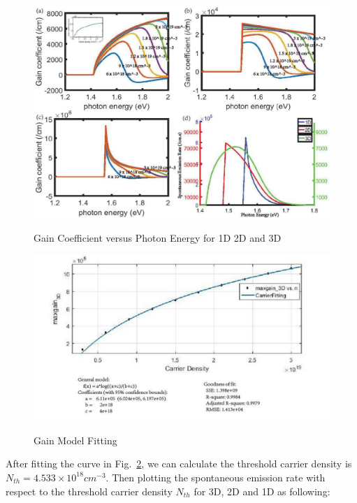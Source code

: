 \begin{figure}
  \caption{Gain Coefficient versus Photon Energy for 1D 2D and 3D}
  \centering
  \includegraphics[width=\textwidth]{pictures/LT/gainspectrum}
  \label{gainspectrum}
\end{figure}

\begin{figure}
  \caption{Gain Model Fitting}
  \centering
  \includegraphics[width=\textwidth]{pictures/LT/gainModelFit_Anoted}
  \label{gainModelFit_Anoted}
\end{figure}

After fitting the curve in Fig.~\ref{gainModelFit_Anoted}, we can calculate the
threshold carrier density is $N_{th} = 4.533\times10^{18} cm^{-3}$. Then
plotting the spontaneous emission rate with respect to the threshold carrier
density $N_{th}$ for 3D, 2D and 1D as following: 

